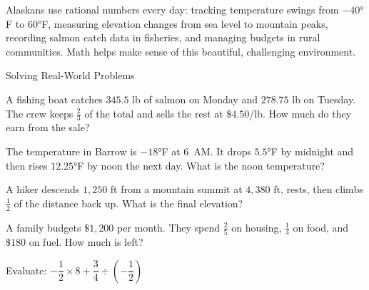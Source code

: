 \begin{realWorld}
Alaskans use rational numbers every day: tracking temperature swings from $-40°$F to $60°$F, measuring elevation changes from sea level to mountain peaks, recording salmon catch data in fisheries, and managing budgets in rural communities. Math helps make sense of this beautiful, challenging environment.
\end{realWorld}


\begin{practiceBox}{Solving Real-World Problems}
\resetProblems

\prob A fishing boat catches $345.5$ lb of salmon on Monday and $278.75$ lb on Tuesday. The crew keeps $\frac{2}{3}$ of the total and sells the rest at $\$4.50$/lb. How much do they earn from the sale?

\prob The temperature in Barrow is $-18°$F at $6$~AM. It drops $5.5°$F by midnight and then rises $12.25°$F by noon the next day. What is the noon temperature?

\prob A hiker descends $1{,}250$ ft from a mountain summit at $4{,}380$ ft, rests, then climbs $\frac{1}{2}$ of the distance back up. What is the final elevation?

\prob A family budgets $\$1{,}200$ per month. They spend $\frac{2}{5}$ on housing, $\frac{1}{4}$ on food, and $\$180$ on fuel. How much is left?

\prob Evaluate: $-\dfrac{1}{2} \times 8 + \dfrac{3}{4} \div \left(-\dfrac{1}{2}\right)$

\end{practiceBox}
